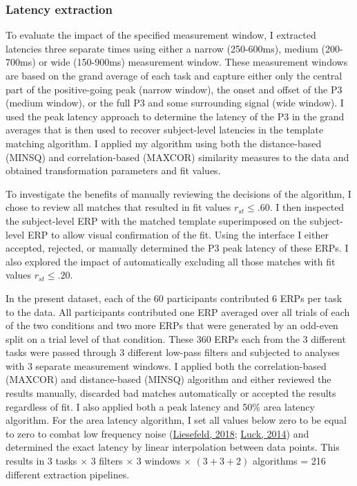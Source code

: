 \documentclass[
  man]{apa7}
\begin{document}
\hypertarget{latency-extraction}{%
\subsubsection{Latency extraction}\label{latency-extraction}}

To evaluate the impact of the specified measurement window, I extracted latencies three separate times using either a narrow (250-600ms), medium (200-700ms) or wide (150-900ms) measurement window. These measurement windows are based on the grand average of each task and capture either only the central part of the positive-going peak (narrow window), the onset and offset of the P3 (medium window), or the full P3 and some surrounding signal (wide window). I used the peak latency approach to determine the latency of the P3 in the grand averages that is then used to recover subject-level latencies in the template matching algorithm. I applied my algorithm using both the distance-based (MINSQ) and correlation-based (MAXCOR) similarity measures to the data and obtained transformation parameters and fit values.

To investigate the benefits of manually reviewing the decisions of the algorithm, I chose to review all matches that resulted in fit values \(r_{st} \le .60\). I then inspected the subject-level ERP with the matched template superimposed on the subject-level ERP to allow visual confirmation of the fit. Using the interface I either accepted, rejected, or manually determined the P3 peak latency of these ERPs. I also explored the impact of automatically excluding all those matches with fit values \(r_{st} \le .20\).

In the present dataset, each of the 60 participants contributed 6 ERPs per task to the data. All participants contributed one ERP averaged over all trials of each of the two conditions and two more ERPs that were generated by an odd-even split on a trial level of that condition. These 360 ERPs each from the 3 different tasks were passed through 3 different low-pass filters and subjected to analyses with 3 separate measurement windows. I applied both the correlation-based (MAXCOR) and distance-based (MINSQ) algorithm and either reviewed the results manually, discarded bad matches automatically or accepted the results regardless of fit. I also applied both a peak latency and 50\% area latency algorithm. For the area latency algorithm, I set all values below zero to be equal to zero to combat low frequency noise (\protect\hyperlink{ref-liesefeld2018estimating}{Liesefeld, 2018}; \protect\hyperlink{ref-luck2014introduction}{Luck, 2014}) and determined the exact latency by linear interpolation between data points. This results in 3 tasks \(\times\) 3 filters \(\times\) 3 windows \(\times\) \((3 + 3 + 2)\) algorithms = 216 different extraction pipelines.
\end{document}
